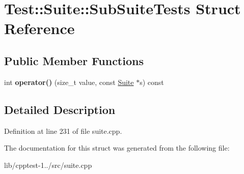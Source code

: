\hypertarget{struct_test_1_1_suite_1_1_sub_suite_tests}{}\section{Test\+:\+:Suite\+:\+:Sub\+Suite\+Tests Struct Reference}
\label{struct_test_1_1_suite_1_1_sub_suite_tests}
\subsection*{Public Member Functions}
\begin{DoxyCompactItemize}
\item 
int {\bfseries operator()} (size\+\_\+t value, const \hyperlink{class_test_1_1_suite}{Suite} $\ast$s) const \hypertarget{struct_test_1_1_suite_1_1_sub_suite_tests_a22e7030bab1d91506d14a1b5c3631760}{}\label{struct_test_1_1_suite_1_1_sub_suite_tests_a22e7030bab1d91506d14a1b5c3631760}

\end{DoxyCompactItemize}


\subsection{Detailed Description}


Definition at line 231 of file suite.\+cpp.



The documentation for this struct was generated from the following file\+:\begin{DoxyCompactItemize}
\item 
lib/cpptest-\/1../src/suite.\+cpp\end{DoxyCompactItemize}
